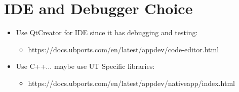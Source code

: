 \section{IDE and Debugger Choice}


\begin{itemize}
	\item Use QtCreator for IDE since it has debugging and testing:
	\begin{itemize}
		\item https://docs.ubports.com/en/latest/appdev/code-editor.html
	\end{itemize}
\end{itemize}


\begin{itemize}
	\item Use C++... maybe use UT Specific libraries:
	\begin{itemize}
		\item https://docs.ubports.com/en/latest/appdev/nativeapp/index.html
	\end{itemize}
\end{itemize}

